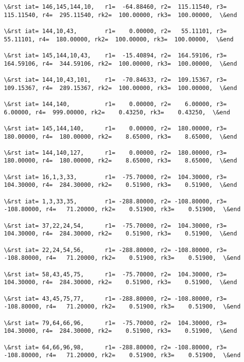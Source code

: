 \documentclass[11pt]{article}
\begin{document}
\begin{Verbatim}[commandchars=\\\{\}]
\&rst iat= 146,145,144,10,   r1=  -64.88460, r2=  115.11540, r3=  115.11540, r4=  295.11540, rk2=  100.00000, rk3=  100.00000,  \&end

\&rst iat= 144,10,43,        r1=    0.00000, r2=   55.11101, r3=   55.11101, r4=  180.00000, rk2=  100.00000, rk3=  100.00000,  \&end

\&rst iat= 145,144,10,43,    r1=  -15.40894, r2=  164.59106, r3=  164.59106, r4=  344.59106, rk2=  100.00000, rk3=  100.00000,  \&end

\&rst iat= 144,10,43,101,    r1=  -70.84633, r2=  109.15367, r3=  109.15367, r4=  289.15367, rk2=  100.00000, rk3=  100.00000,  \&end

\&rst iat= 144,140,          r1=    0.00000, r2=    6.00000, r3=    6.00000, r4=  999.00000, rk2=    0.43250, rk3=    0.43250,  \&end

\&rst iat= 145,144,140,      r1=    0.00000, r2=  180.00000, r3=  180.00000, r4=  180.00000, rk2=    8.65000, rk3=    8.65000,  \&end

\&rst iat= 144,140,127,      r1=    0.00000, r2=  180.00000, r3=  180.00000, r4=  180.00000, rk2=    8.65000, rk3=    8.65000,  \&end

\&rst iat= 16,1,3,33,        r1=  -75.70000, r2=  104.30000, r3=  104.30000, r4=  284.30000, rk2=    0.51900, rk3=    0.51900,  \&end

\&rst iat= 1,3,33,35,        r1= -288.80000, r2= -108.80000, r3= -108.80000, r4=   71.20000, rk2=    0.51900, rk3=    0.51900,  \&end

\&rst iat= 37,22,24,54,      r1=  -75.70000, r2=  104.30000, r3=  104.30000, r4=  284.30000, rk2=    0.51900, rk3=    0.51900,  \&end

\&rst iat= 22,24,54,56,      r1= -288.80000, r2= -108.80000, r3= -108.80000, r4=   71.20000, rk2=    0.51900, rk3=    0.51900,  \&end

\&rst iat= 58,43,45,75,      r1=  -75.70000, r2=  104.30000, r3=  104.30000, r4=  284.30000, rk2=    0.51900, rk3=    0.51900,  \&end

\&rst iat= 43,45,75,77,      r1= -288.80000, r2= -108.80000, r3= -108.80000, r4=   71.20000, rk2=    0.51900, rk3=    0.51900,  \&end

\&rst iat= 79,64,66,96,      r1=  -75.70000, r2=  104.30000, r3=  104.30000, r4=  284.30000, rk2=    0.51900, rk3=    0.51900,  \&end

\&rst iat= 64,66,96,98,      r1= -288.80000, r2= -108.80000, r3= -108.80000, r4=   71.20000, rk2=    0.51900, rk3=    0.51900,  \&end


\end{Verbatim}
\end{document}
